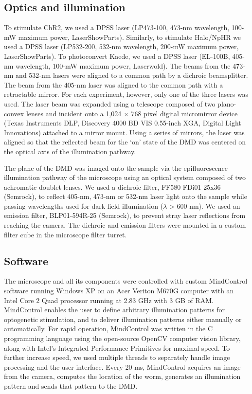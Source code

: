 \subsection{Optics and illumination} \label{colbert:opticsMetheds}
To stimulate ChR2, we used a DPSS laser (LP473-100, 473-nm wavelength, 100-mW maximum power, LaserShowParts). Similarly, to stimulate Halo/NpHR we used a DPSS laser (LP532-200, 532-nm wavelength, 200-mW maximum power, LaserShowParts). To photoconvert Kaede, we used a DPSS laser (EL-100B, 405-nm wavelength, 100-mW maximum power, Laserwold). The beams from the 473-nm and 532-nm lasers were aligned to a common path by a dichroic beamsplitter. The beam from the 405-nm laser was aligned to the common path with a retractable mirror. For each experiment, however, only one of the three lasers was used. The laser beam was expanded using a telescope composed of two plano-convex lenses and incident onto a 1,024 × 768 pixel digital micromirror device (Texas Instruments DLP, Discovery 4000 BD VIS 0.55-inch XGA, Digital Light Innovations) attached to a mirror mount. Using a series of mirrors, the laser was aligned so that the reflected beam for the `on' state of the DMD was centered on the optical axis of the illumination pathway.

The plane of the DMD was imaged onto the sample via the epifluorescence illumination pathway of the microscope using an optical system composed of two achromatic doublet lenses. We used a dichroic filter, FF580-FDi01-25x36 (Semrock), to reflect 405-nm, 473-nm or 532-nm laser light onto the sample while passing wavelengths used for dark-field illumination ($\lambda$ > 600 nm). We used an emission filter, BLP01-594R-25 (Semrock), to prevent stray laser reflections from reaching the camera. The dichroic and emission filters were mounted in a custom filter cube in the microscope filter turret.

\subsection{Software}
The microscope and all its components were controlled with custom MindControl software running Windows XP on an Acer Veriton M670G computer with an Intel Core 2 Quad processor running at 2.83 GHz with 3 GB of RAM. MindControl enables the user to define arbitrary illumination patterns for optogenetic stimulation, and to deliver illumination patterns either manually or automatically. For rapid operation, MindControl was written in the C programming language using the open-source OpenCV computer vision library, along with Intel's Integrated Performance Primitives for maximal speed. To further increase speed, we used multiple threads to separately handle image processing and the user interface. Every 20 ms, MindControl acquires an image from the camera, computes the location of the worm, generates an illumination pattern and sends that pattern to the DMD. 

